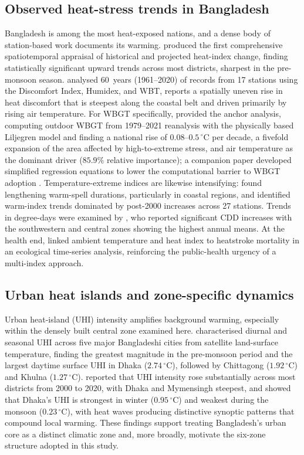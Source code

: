 \documentclass[pdflatex,sn-basic,lineno]{sn-jnl}
\newcommand{\degC}{\ensuremath{^{\circ}\mathrm{C}}}
\begin{document}
\subsection{Observed heat-stress trends in Bangladesh}
Bangladesh is among the most heat-exposed nations, and a dense body of
station-based work documents its warming. \citet{rahman2021} produced the first
comprehensive spatiotemporal appraisal of historical and projected heat-index
change, finding statistically significant upward trends across most districts,
sharpest in the pre-monsoon season. \citet{tanim2024heat} analysed 60~years
(1961--2020) of records from 17 stations using the Discomfort Index, Humidex, and
WBT, reports a spatially uneven rise in heat discomfort that is steepest along
the coastal belt and driven primarily by rising air temperature. For WBGT
specifically, \citet{kamal2024scientific} provided the anchor analysis, computing
outdoor WBGT from 1979--2021 reanalysis with the physically based Liljegren model
and finding a national rise of $0.08$--$0.5\,\degC$ per decade, a fivefold
expansion of the area affected by high-to-extreme stress, and air temperature as
the dominant driver ($85.9\%$ relative importance); a companion paper developed
simplified regression equations to lower the computational barrier to WBGT
adoption \citep{kamal2024ijc}. Temperature-extreme indices are likewise
intensifying: \citet{ahmed2022} found lengthening warm-spell durations,
particularly in coastal regions, and \citet{islam2021extremes} identified
warm-index trends dominated by post-2000 increases across 27 stations. Trends in
degree-days were examined by \citet{islam2020cdd}, who reported significant CDD
increases with the southwestern and central zones showing the highest annual
means. At the health end, \citet{miah2026} linked ambient temperature and heat
index to heatstroke mortality in an ecological time-series analysis, reinforcing
the public-health urgency of a multi-index approach.

\subsection{Urban heat islands and zone-specific dynamics}
Urban heat-island (UHI) intensity amplifies background warming, especially within
the densely built central zone examined here. \citet{dewan2021} characterised
diurnal and seasonal UHI across five major Bangladeshi cities from satellite
land-surface temperature, finding the greatest magnitude in the pre-monsoon period
and the largest daytime surface UHI in Dhaka ($2.74\,\degC$), followed by
Chittagong ($1.92\,\degC$) and Khulna ($1.27\,\degC$). \citet{faisal2022} reported
that UHI intensity rose substantially across most districts from 2000 to 2020,
with Dhaka and Mymensingh steepest, and \citet{park2024} showed that Dhaka's UHI
is strongest in winter ($0.95\,\degC$) and weakest during the monsoon
($0.23\,\degC$), with heat waves producing distinctive synoptic patterns that
compound local warming. These findings support treating Bangladesh's urban core as
a distinct climatic zone and, more broadly, motivate the six-zone structure adopted
in this study.
\end{document}
